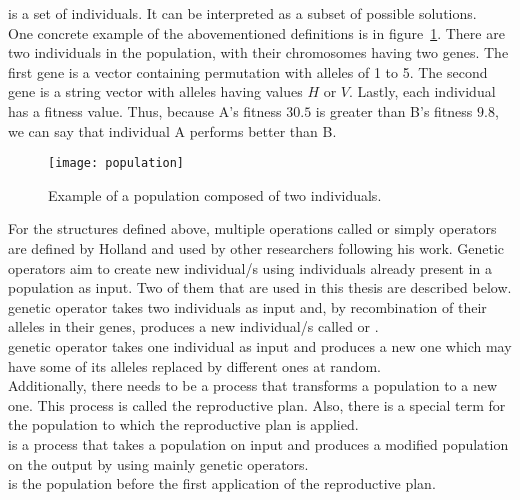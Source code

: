  is a set of individuals.
It can be interpreted as a subset of possible solutions.\\

One concrete example of the abovementioned definitions is in figure~\ref{fig:population}.
There are two individuals in the population, with their chromosomes having two genes.
The first gene is a vector containing permutation with alleles of 1 to 5.
The second gene is a string vector
with alleles having values $H$ or $V$.
Lastly, each individual has a fitness value.
Thus, because A’s fitness $30.5$ is greater than B’s fitness $9.8$, we can say that individual A performs better than B.


\begin{figure}
    \texttt{[image: population]}
    \caption[Population example]{Example of a population composed of two individuals.}
    \label{fig:population}
\end{figure}

For the structures defined above, multiple operations called  or simply operators
are defined by Holland and used by other researchers following his work.
Genetic operators aim to create new individual/s using individuals already present in a population as input.
Two of them that are used in this thesis are described below.\\


 genetic operator takes two individuals as input and, by recombination
of their alleles in their genes, produces a new individual/s called  or .\\

 genetic operator takes one individual as input and produces a new one
which may have some of its alleles replaced by different ones at random.\\

Additionally, there needs to be a process that transforms a population
to a new one.
This process is called the reproductive plan.
Also, there is a special term for the population to which the reproductive plan is applied.
\\

 is a process that takes a population on input and produces a modified population on the output
by using mainly genetic operators.\\

 is the population before the first application of the reproductive plan.\\

